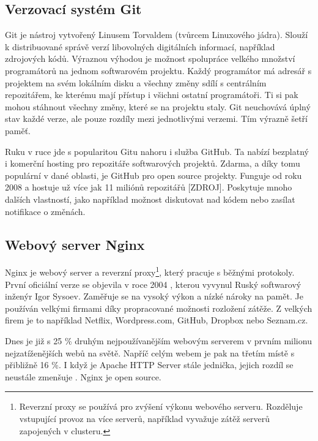 \subsection{Verzovací systém Git}

\indent

Git je nástroj vytvořený Linusem Torvaldem (tvůrcem Linuxového jádra).
Slouží k distribuované správě verzí libovolných digitálních informací, například zdrojových kódů.
Výraznou výhodou je možnost spolupráce velkého množství programátorů na jednom softwarovém projektu. 
Každý programátor má adresář s projektem na svém lokálním disku a všechny změny sdílí s centrálním repozitářem,
ke kterému mají přístup i všichni ostatní programátoři. Ti si pak mohou stáhnout všechny změny,
které se na projektu staly. Git neuchovává úplný stav každé verze, ale pouze rozdíly mezi jednotlivými verzemi.
Tím výrazně šetří paměť.  

\medskip

Ruku v ruce jde s popularitou Gitu nahoru i služba GitHub.
Ta nabízí bezplatný i komerční hosting pro repozitáře softwarových projektů.
Zdarma, a díky tomu populární v dané oblasti, je GitHub pro open source projekty.
Funguje od roku 2008 a hostuje už více jak 11 miliónů repozitářů [ZDROJ].
Poskytuje mnoho dalších vlastností, jako například možnost diskutovat nad kódem
nebo zasílat notifikace o změnách.

\subsection{Webový server Nginx}

\indent

Nginx je webový server a reverzní proxy\footnote{Reverzní proxy se používá pro zvýšení výkonu webového serveru.
Rozděluje vstupující provoz na více serverů, například vyvažuje zátěž serverů zapojených v clusteru.}, který pracuje s běžnými protokoly.
První oficiální verze se objevila v roce 2004 \cite{nginx-changes}, kterou vyvynul Ruský softwarový inženýr Igor Sysoev.
Zaměřuje se na vysoký výkon a nízké nároky na pamět. Je používán velkými firmami
díky propracované možnosti rozložení zátěže. Z velkých firem je to například Netflix, Wordpress.com,
GitHub, Dropbox nebo Seznam.cz.

\medskip

Dnes je již s 25 \% druhým nejpoužívanějším webovým serverem v prvním milionu nejzatíženějších webů na světě.
Napříč celým webem je pak na třetím místě s přibližně 16 \%. I když je Apache HTTP Server stále jednička, 
jejich rozdíl se neustále zmenšuje \cite{nginx-statistic}. Nginx je open source.

